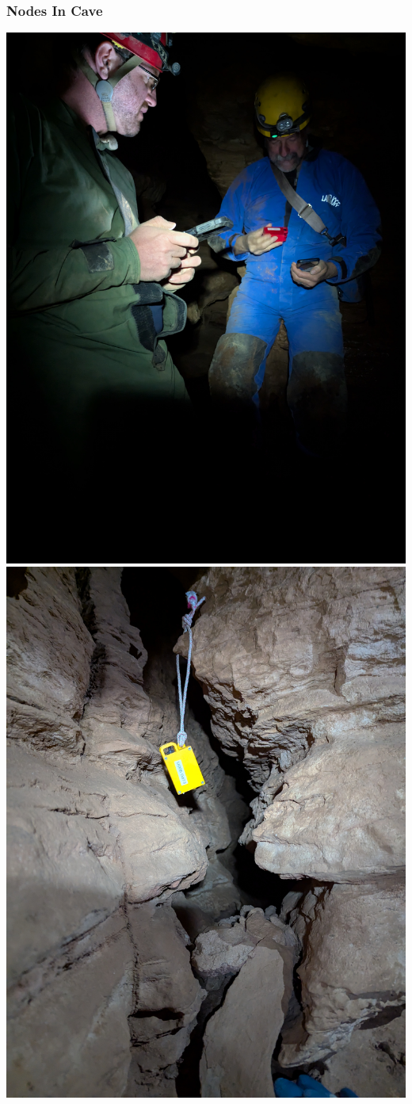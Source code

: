 \documentclass{beamer}
\begin{document}
\begin{frame}
\frametitle{Nodes In Cave}

\begin{center}
\includegraphics[width=.47\textwidth]{../images/PXL_20250425_162817720.jpg}\hfill
\includegraphics[width=.47\textwidth]{../images/PXL_20250425_165505959.jpg}
\end{center}

\end{frame}
\end{document}
